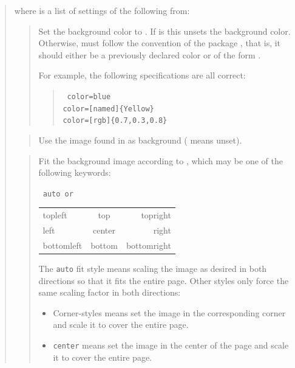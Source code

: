 \documentclass[12pt]{article}
\begin{document}
\medskip\noindent
\docdef \advibg \doctt {[global]}
\begin{quote}
where  is a list of settings of the following from:

\begin{quote}
Set the background color to .
If  is  this unsets the background color. 
Otherwise,  must follow the convention of the package 
, that is, it should either be a previously declared color or 
of the form . 

For example, the following specifications are all correct:
\begin{quote}\tt
color=blue\\
color=[named]\{Yellow\}\\
color=[rgb]\{0.7,0.3,0.8\}\\
\end{quote}
\end{quote}

\begin{quote}
Use the image found in  as background ( means unset).
\end{quote}

\begin{quote}
Fit the background image according to , which may be 
one of the following keywords:
\begin{center}
\tt
auto \hfill {\rm or} \hfill
\begin{tabular}{l@{\qquad}c@{\qquad}r}
topleft&   top& topright\\
left&  center&  right \\
bottomleft& bottom & bottomright\\
\end{tabular}
\end{center}
The {\tt auto} fit style means scaling the image as desired in both directions
so that it fits the entire page. Other styles only force the same scaling
factor in both directions:
\begin {itemize}

\item Corner-styles means set the image in the corresponding corner
and scale it to cover the entire page.

\item {\tt center} means set the image in the center of the page and
scale it to cover the entire page.


\end{itemize}
\end{quote}
\end{quote}
\end{document}
